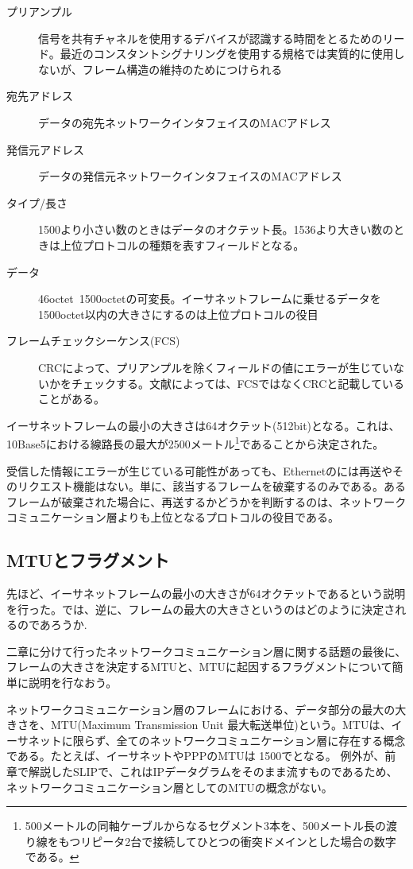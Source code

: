 \begin{description}
\item[プリアンプル]信号を共有チャネルを使用するデバイスが認識する時間をとるためのリード。最近のコンスタントシグナリングを使用する規格では実質的に使用しないが、フレーム構造の維持のためにつけられる
\item[宛先アドレス]データの宛先ネットワークインタフェイスのMACアドレス
\item[発信元アドレス]データの発信元ネットワークインタフェイスのMACアドレス
\item[タイプ/長さ]1500より小さい数のときはデータのオクテット長。1536より大きい数のときは上位プロトコルの種類を表すフィールドとなる。
\item[データ]46octet~1500octetの可変長。イーサネットフレームに乗せるデータを1500octet以内の大きさにするのは上位プロトコルの役目
\item[フレームチェックシーケンス(FCS)]CRCによって、プリアンプルを除くフィールドの値にエラーが生じていないかをチェックする。文献によっては、FCSではなくCRCと記載していることがある。
\end{description}

イーサネットフレームの最小の大きさは64オクテット(512bit)となる。これは、10Base5における線路長の最大が2500メートル\footnote{500メートルの同軸ケーブルからなるセグメント3本を、500メートル長の渡り線をもつリピータ2台で接続してひとつの衝突ドメインとした場合の数字である。}であることから決定された。


受信した情報にエラーが生じている可能性があっても、Ethernetのには再送やそのリクエスト機能はない。単に、該当するフレームを破棄するのみである。あるフレームが破棄された場合に、再送するかどうかを判断するのは、ネットワークコミュニケーション層よりも上位となるプロトコルの役目である。

\subsection{MTUとフラグメント}

先ほど、イーサネットフレームの最小の大きさが64オクテットであるという説明を行った。では、逆に、フレームの最大の大きさというのはどのように決定されるのであろうか. 

二章に分けて行ったネットワークコミュニケーション層に関する話題の最後に、フレームの大きさを決定するMTUと、MTUに起因するフラグメントについて簡単に説明を行なおう。

ネットワークコミュニケーション層のフレームにおける、データ部分の最大の大きさを、MTU(Maximum Transmission Unit 最大転送単位)という。MTUは、イーサネットに限らず、全てのネットワークコミュニケーション層に存在する概念である。たとえば、イーサネットやPPPのMTUは 1500でとなる。
例外が、前章で解説したSLIPで、これはIPデータグラムをそのまま流すものであるため、ネットワークコミュニケーション層としてのMTUの概念がない。

